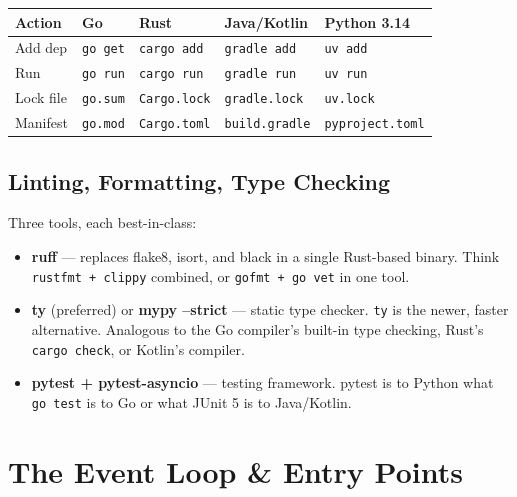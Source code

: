\documentclass[11pt,a4paper,oneside]{book}
\newcommand{\py}[1]{\texttt{\color{pyblue}#1}}
\begin{document}
\begin{analogybox}
\begin{tabularx}{\textwidth}{lllll}
\textbf{Action} & \textcolor{goblue}{\textbf{Go}} & \textcolor{BrickRed}{\textbf{Rust}} & \textcolor{javaorange}{\textbf{Java/Kotlin}} & \textcolor{pyblue}{\textbf{Python 3.14}} \\
\midrule
Add dep     & \texttt{go get}          & \texttt{cargo add}   & \texttt{gradle add} & \texttt{uv add} \\
Run         & \texttt{go run}          & \texttt{cargo run}   & \texttt{gradle run} & \texttt{uv run} \\
Lock file   & \texttt{go.sum}          & \texttt{Cargo.lock}  & \texttt{gradle.lock} & \texttt{uv.lock} \\
Manifest    & \texttt{go.mod}          & \texttt{Cargo.toml}  & \texttt{build.gradle} & \texttt{pyproject.toml} \\
\end{tabularx}
\end{analogybox}

\section{Linting, Formatting, Type Checking}

Three tools, each best-in-class:

\begin{itemize}
    \item \textbf{ruff} --- replaces flake8, isort, and black in a single Rust-based binary.
          Think \texttt{rustfmt + clippy} combined, or \texttt{gofmt + go vet} in one tool.
    \item \textbf{ty} (preferred) or \textbf{mypy --strict} --- static type checker.
          \py{ty} is the newer, faster alternative. Analogous to the Go compiler's built-in type
          checking, Rust's \texttt{cargo check}, or Kotlin's compiler.
    \item \textbf{pytest + pytest-asyncio} --- testing framework. pytest is to Python what
          \texttt{go test} is to Go or what JUnit 5 is to Java/Kotlin.
\end{itemize}

\chapter{The Event Loop \& Entry Points}
\end{document}
